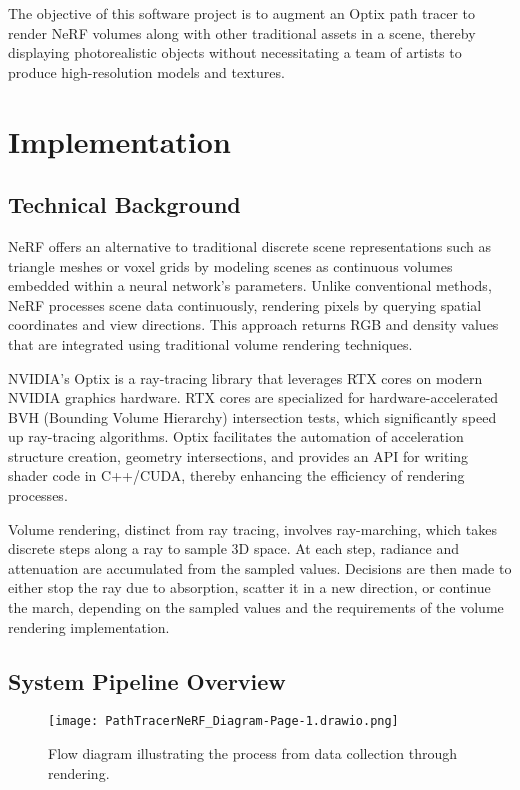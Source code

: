 \documentclass[conference]{IEEEtran}
\begin{document}
The objective of this software project is to augment an Optix path tracer to render NeRF volumes along with other traditional assets in a scene, thereby displaying photorealistic objects without necessitating a team of artists to produce high-resolution models and textures.


\section{Implementation}
\subsection{Technical Background}

NeRF offers an alternative to traditional discrete scene representations such as triangle meshes or voxel grids by modeling scenes as continuous volumes embedded within a neural network's parameters. Unlike conventional methods, NeRF processes scene data continuously, rendering pixels by querying spatial coordinates and view directions. This approach returns RGB and density values that are integrated using traditional volume rendering techniques\cite{mildenHallOGNerf}.


NVIDIA's Optix is a ray-tracing library that leverages RTX cores on modern NVIDIA graphics hardware. RTX cores are specialized for hardware-accelerated BVH (Bounding Volume Hierarchy) intersection tests, which significantly speed up ray-tracing algorithms. Optix facilitates the automation of acceleration structure creation, geometry intersections, and provides an API for writing shader code in C++/CUDA, thereby enhancing the efficiency of rendering processes\cite{OptixManual}.

Volume rendering, distinct from ray tracing, involves ray-marching, which takes discrete steps along a ray to sample 3D space. At each step, radiance and attenuation are accumulated from the sampled values. Decisions are then made to either stop the ray due to absorption, scatter it in a new direction, or continue the march, depending on the sampled values and the requirements of the volume rendering implementation\cite{Pharr2016PBR}.



\subsection{System Pipeline Overview}
\begin{figure}[ht]
    \centering
    \texttt{[image: PathTracerNeRF\_Diagram-Page-1.drawio.png]}
    \caption{Flow diagram illustrating the process from data collection through rendering.}
    \label{fig:processFlowSingleCol}
\end{figure}
\end{document}
